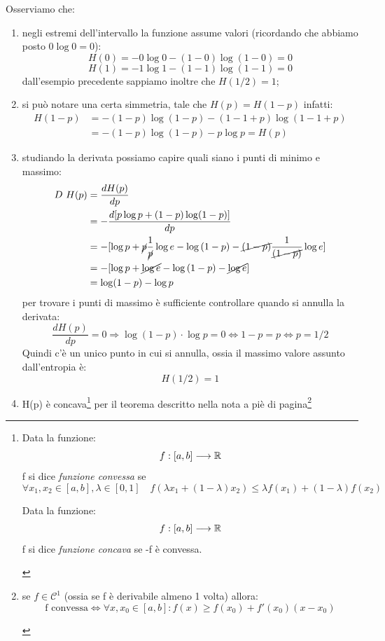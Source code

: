 \noindent
Osserviamo che:
\begin{enumerate}
\item negli estremi dell'intervallo la funzione assume valori (ricordando che abbiamo posto \(0 \log 0 = 0\)):
\[H(0) = - 0 \log{0} -(1-0) \log (1-0) = 0\] 
\[H(1) = - 1 \log{1} -(1-1) \log (1-1) = 0\]
dall'esempio precedente sappiamo inoltre che \(H(1/2) = 1\);
\item si può notare una certa simmetria, tale che \(H(p) = H(1-p)\) infatti:
\[
\begin{split}
H(1-p) &= - (1- p) \log{(1-p)} -(1- 1 + p) \log (1- 1 + p) \\
&= - (1- p) \log{(1-p)} - p \log p = H(p)
\end{split}
\]
\item studiando la derivata possiamo capire quali siano i punti di minimo e massimo:
\[
\begin{split} 
D \ H(p) &= \frac{d H(p)}{d p} \\ 
&= - \frac{d [p \log p + (1-p) \log (1-p)]}{d p} \\ 
&= - [\log p + \cancel{p} \frac{1}{\cancel{p}} \log e - \log{(1-p)} - \cancel{(1-p)} \frac{1}{\cancel{(1-p)}}\log e] \\ 
&= - [\log p +  \cancel{\log e} - \log{(1-p)} - \cancel{\log e}] \\ 
&= \log (1-p) - \log p \\ 
\end{split} 
\]
per trovare i punti di massimo è sufficiente controllare quando si annulla la derivata:
\[\frac{d H(p)}{d p} = 0 \Longrightarrow \log (1-p) \cdot \log p = 0 \iff 1-p = p \iff p = 1/2\]
Quindi c'è un unico punto in cui si annulla, ossia il massimo valore assunto dall'entropia è:
\[H(1/2) = 1\]
\item H(p) è concava\footnote{
\begin{definizione}
Data la funzione:
\[f: [a,b] \longrightarrow \mathbb{R} \]
f si dice \textit{funzione convessa} se
\[\forall x_1, x_2 \in [a,b], \lambda \in [0,1] \quad f(\lambda x_1 + (1-\lambda)x_2) \leq \lambda f(x_1) + (1-\lambda) f(x_2)\]
\end{definizione}

\begin{definizione}
Data la funzione:
\[f: [a,b] \longrightarrow \mathbb{R} \]f si dice \textit{funzione concava} se -f è convessa.
\end{definizione}
} per il teorema descritto nella nota a piè di pagina\footnote{
\begin{teorema}
se \(f \in \mathcal{C}^1\) (ossia se f è derivabile almeno 1 volta) allora:
\[\mbox{f convessa} \iff \forall x, x_0 \in [a,b] : f(x) \geq f(x_0) + f'(x_0) (x-x_0)\]
\label{concava1}
\end{teorema}

}
\end{enumerate}
